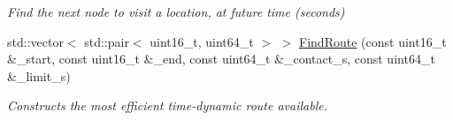 \begin{DoxyCompactItemize}
\begin{DoxyCompactList}\small\item\em Find the next node to visit a location, at future time (seconds) \end{DoxyCompactList}\item 
std\+::vector$<$ std\+::pair$<$ uint16\+\_\+t, uint64\+\_\+t $>$ $>$ \hyperlink{classosse_1_1collaborate_1_1_scheduler_alpha_abf3bad26233bb4a9094a0236bc380f8e}{Find\+Route} (const uint16\+\_\+t \&\+\_\+start, const uint16\+\_\+t \&\+\_\+end, const uint64\+\_\+t \&\+\_\+contact\+\_\+s, const uint64\+\_\+t \&\+\_\+limit\+\_\+s)
\begin{DoxyCompactList}\small\item\em Constructs the most efficient time-\/dynamic route available. \end{DoxyCompactList}\end{DoxyCompactItemize}
